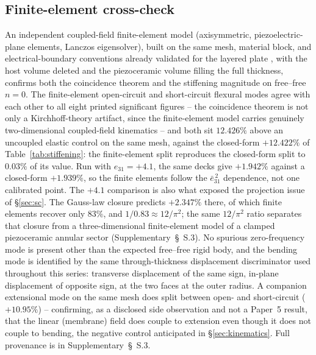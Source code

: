\documentclass[11pt]{article}
\newcommand{\eebar}{\bar{e}_{31}}
\begin{document}
\subsection{Finite-element cross-check}\label{sec:fe}
An independent coupled-field finite-element model (axisymmetric,
piezoelectric-plane elements, Lanczos eigensolver), built on the same
mesh, material block, and electrical-boundary conventions already
validated for the layered plate \cite{mccune2026piezo}, with the host
volume deleted and the piezoceramic volume filling the full thickness,
confirms both the coincidence theorem and the stiffening magnitude on
free--free $n=0$. The finite-element open-circuit and short-circuit
flexural modes agree with each other to all eight printed significant
figures -- the coincidence theorem is not only a Kirchhoff-theory
artifact, since the finite-element model carries genuinely
two-dimensional coupled-field kinematics -- and both sit $12.426\%$
above an uncoupled elastic control on the same mesh, against the
closed-form $+12.422\%$ of Table~\ref{tab:stiffening}: the
finite-element split reproduces the closed-form split to $0.03\%$ of its
value. Run with $e_{31}=+4.1$, the same decks give $+1.942\%$ against a
closed-form $+1.939\%$, so the finite elements follow the
$\eebar^{\,2}$ dependence, not one calibrated point. The $+4.1$
comparison is also what exposed the projection issue of
\S\ref{sec:sc}. The Gauss-law closure predicts $+2.347\%$ there, of which
finite elements recover only $83\%$, and $1/0.83\approx12/\pi^2$; the
same $12/\pi^2$ ratio separates that closure from a three-dimensional
finite-element model of a clamped piezoceramic annular sector
(Supplementary~\S~S.3). No spurious zero-frequency mode is present other
than the expected free--free rigid body, and the bending mode is
identified by the same through-thickness displacement discriminator used
throughout this series: transverse displacement of the same sign,
in-plane displacement of opposite sign, at the two faces at the outer
radius. A companion extensional mode on the same mesh does split between
open- and short-circuit ($+10.95\%$) -- confirming, as a disclosed side
observation and not a Paper~5 result, that the linear (membrane) field
does couple to extension even though it does not couple to bending, the
negative control anticipated in \S\ref{sec:kinematics}. Full provenance
is in Supplementary~\S~S.3.
\end{document}
